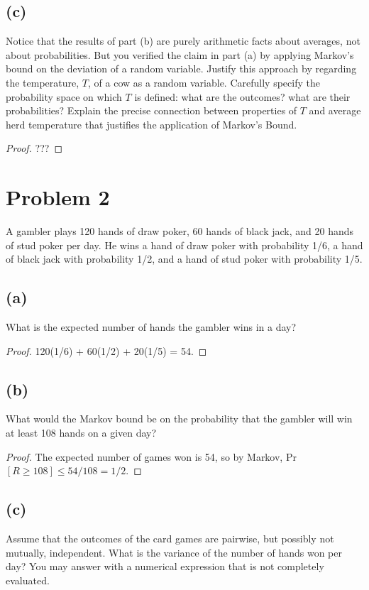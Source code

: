 \documentclass[14pt]{extarticle}
\begin{document}
\subsection{(c)}
Notice that the results of part (b) are purely arithmetic facts about averages, not about probabilities. But you verified the claim in part (a) by applying Markov’s bound on the deviation of a random variable. Justify this approach by regarding the temperature, $T$, of a cow as a random variable. Carefully specify the probability space on which $T$ is defined: what are the outcomes? what are their probabilities? Explain the precise connection between properties of $T$ and average herd temperature that justifies the application of Markov’s Bound.
\begin{proof}
???
\end{proof}

\section{Problem 2}
A gambler plays 120 hands of draw poker, 60 hands of black jack, and 20 hands of stud poker per day. He wins a hand of draw poker with probability 1/6, a hand of black jack with probability 1/2, and a hand of stud poker with probability 1/5.

\subsection{(a)}
What is the expected number of hands the gambler wins in a day?

\begin{proof}
120(1/6) + 60(1/2) + 20(1/5) = 54.
\end{proof}

\subsection{(b)}
What would the Markov bound be on the probability that the gambler will win at least 108 hands on a given day?

\begin{proof}
The expected number of games won is 54, so by Markov, Pr$[R \geq 108] \leq 54/108 = 1/2$.
\end{proof}

\subsection{(c)}
Assume that the outcomes of the card games are pairwise, but possibly not mutually, independent. What is the variance of the number of hands won per day? You may answer with a numerical expression that is not completely evaluated.
\end{document}

